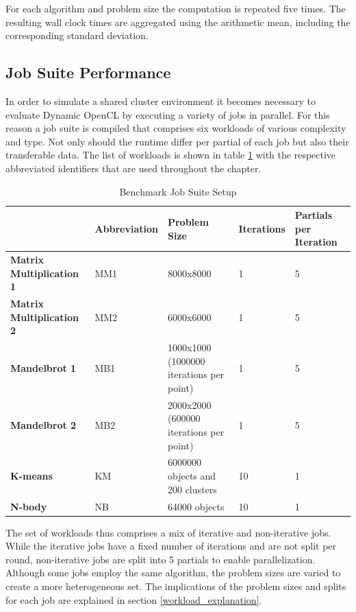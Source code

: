For each algorithm and problem size the computation is repeated five times. The resulting wall clock times are aggregated using the arithmetic mean, including the corresponding standard deviation.

\subsection{Job Suite Performance}

In order to simulate a shared cluster environment it becomes necessary to evaluate Dynamic OpenCL by executing a variety of jobs in parallel. For this reason a job suite is compiled that comprises six workloads of various complexity and type. Not only should the runtime differ per partial of each job but also their transferable data. The list of workloads is shown in table \ref{table:benchmark_job_setup} with the respective abbreviated identifiers that are used throughout the chapter.

\begin{table}[!htb]
	\centering
	\begin{adjustbox}{width=0.95\textwidth}
		\small
		\begin{tabular}{l | l | l | l | l}
			~ & \textbf{Abbreviation}						& \textbf{Problem Size}		& \textbf{Iterations}	& \textbf{Partials per Iteration} \\
			\hline
			\textbf{Matrix Multiplication 1}	& MM1  	& 8000x8000  								& 1 	& 5 \\
			\textbf{Matrix Multiplication 2} 	& MM2	& 6000x6000  								& 1		& 5 \\
			\textbf{Mandelbrot 1}     		 	& MB1	& 1000x1000 (1000000 iterations per point) 	& 1		& 5 \\
			\textbf{Mandelbrot 2}				& MB2	& 2000x2000 (600000 iterations per point)  	& 1		& 5 \\
			\textbf{K-means}          			& KM 	& 6000000 objects and 200 clusters  		& 10	& 1 \\
			\textbf{N-body}    		 			& NB 	& 64000 objects  							& 10	& 1 \\
		\end{tabular}
	\end{adjustbox}

	\caption{Benchmark Job Suite Setup}
	\label{table:benchmark_job_setup}
\end{table}

The set of workloads thus comprises a mix of iterative and non-iterative jobs. While the iterative jobs have a fixed number of iterations and are not split per round, non-iterative jobs are split into 5 partials to enable parallelization. Although some jobs employ the same algorithm, the problem sizes are varied to create a more heterogeneous set. The implications of the problem sizes and splits for each job are explained in section \ref{workload_explanation}.

